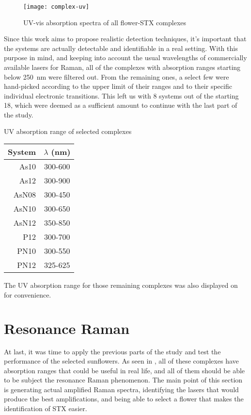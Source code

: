\begin{figure*}
    \texttt{[image: complex-uv]}
    \caption[UV-vis absorption spectra of all complexes]{UV-vis absorption spectra of all flower-STX complexes}
\end{figure*}

Since this work aims to propose realistic detection techniques, it's important that the systems are actually detectable and identifiable in a real setting.
With this purpose in mind, and keeping into account the usual wavelengths of commercially available lasers for Raman, all of the complexes with absorption ranges starting below \SI{250}{\nano\metre} were filtered out.
From the remaining ones, a select few were hand-picked according to the upper limit of their ranges and to their specific individual electronic transitions.
This left us with 8 systems out of the starting 18, which were deemed as a sufficient amount to continue with the last part of the study.

\begin{margintable}
    \centering
    \caption[UV absorption range of selected complexes]{UV absorption range of selected complexes}
    \begin{tabular}{@{}rc@{}}
        \toprule
        System & $\lambda$ (\si{\nano\metre}) \\
        \midrule
        As10 & 300-600 \\
        As12 & 300-900 \\
        AsN08 & 300-450 \\
        AsN10 & 300-650 \\
        AsN12 & 350-850 \\
        P12 & 300-700 \\
        PN10 & 300-550 \\
        PN12 & 325-625 \\
    \end{tabular}
\end{margintable}

The UV absorption range for those remaining complexes was also displayed on  for convenience.

\section{Resonance Raman}
At last, it was time to apply the previous parts of the study and test the performance of the selected sunflowers.
As seen in , all of these complexes have absorption ranges that could be useful in real life, and all of them should be able to be subject the resonance Raman phenomenon.
The main point of this section is generating actual amplified Raman spectra, identifying the lasers that would produce the best amplifications, and being able to select a flower that makes the identification of STX easier.

